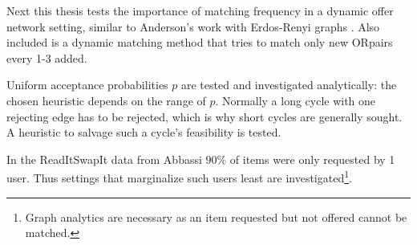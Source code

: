\documentclass[main.tex]{subfiles}
\begin{document}
Next this thesis tests the importance of matching frequency in a dynamic offer network setting, similar to Anderson's work with Erdos-Renyi graphs \cite{And1}. Also included is a dynamic matching method that tries to match only new ORpairs every 1-3 added.

Uniform acceptance probabilities $p$ are tested and investigated analytically: the chosen heuristic depends on the range of $p$. Normally a long cycle with one rejecting edge has to be rejected, which is why short cycles are generally sought. A heuristic to salvage such a cycle's feasibility is tested.

In the ReadItSwapIt data from Abbassi \cite{Abb2} $90\%$ of items were only requested by 1 user. Thus settings that marginalize such users least are investigated\footnote{Graph analytics are necessary as an item requested but not offered cannot be matched.}.
\end{document}
